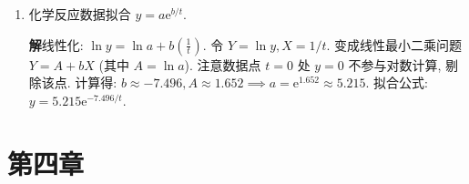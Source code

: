 \documentclass[a4paper,11pt]{ctexart}
\newcommand{\sol}{\par\noindent\textbf{解}\quad}
\newcommand{\e}{\mathrm{e}}
\begin{document}
\begin{enumerate}[label=\textbf{3-\arabic*.}, leftmargin=*]
    \sol 设 $X = x^2$, 则模型变为 $y = a + bX$.
    法方程组:
    \[
    \begin{cases}
    na + (\sum x_i^2)b = \sum y_i \\
    (\sum x_i^2)a + (\sum x_i^4)b = \sum x_i^2 y_i
    \end{cases}
    \]
    计算各求和项 ($n=5$):
    $\sum x_i^2 = 19^2+25^2+31^2+38^2+44^2 = 5327$.
    $\sum x_i^4 = 7277699$.
    $\sum y_i = 271.4$.
    $\sum x_i^2 y_i = 19^2(19)+ \dots = 369321.5$.
    代入方程组求解得: $a \approx 0.9726, b \approx 0.0500$.
    公式: $y = 0.9726 + 0.0500x^2$.
    均方误差 $\|\delta\|_2 = \sqrt{\sum (y_i - (a+bx_i^2))^2} \approx 0.130$.

    \item[18.] 化学反应数据拟合 $y = a\e^{b/t}$.
    
    \sol 线性化: $\ln y = \ln a + b(\frac{1}{t})$. 令 $Y = \ln y, X = 1/t$.
    变成线性最小二乘问题 $Y = A + bX$ (其中 $A = \ln a$).
    注意数据点 $t=0$ 处 $y=0$ 不参与对数计算, 剔除该点.
    计算得: $b \approx -7.496, A \approx 1.652 \implies a = \e^{1.652} \approx 5.215$.
    拟合公式: $y = 5.215 \e^{-7.496/t}$.
\end{enumerate}

\section*{第四章}
\end{document}
